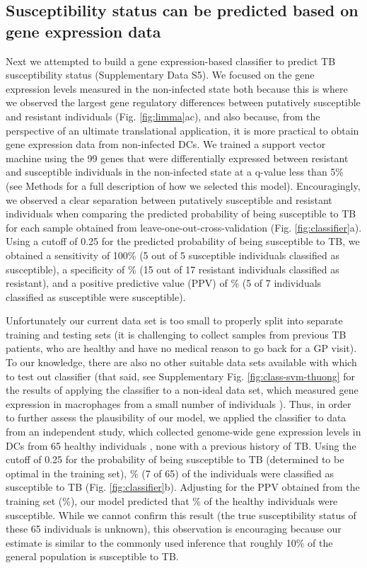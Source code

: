 \documentclass[fleqn,10pt]{wlscirep}
\begin{document}
\subsection*{Susceptibility status can be predicted based on gene expression data}

Next we attempted to build a gene expression-based classifier to
predict TB susceptibility status (Supplementary Data S5). We focused
on the gene expression levels measured in the non-infected state both
because this is where we observed the largest gene regulatory
differences between putatively susceptible and resistant individuals
(Fig. \ref{fig:limma}ac), and also because, from the perspective of an
ultimate translational application, it is more practical to obtain
gene expression data from non-infected DCs. We trained a support
vector machine using the 99 genes that were differentially expressed
between resistant and susceptible individuals in the non-infected
state at a q-value less than 5\% (see Methods for a full description
of how we selected this model). Encouragingly, we observed a clear
separation between putatively susceptible and resistant individuals
when comparing the predicted probability of being susceptible to TB
for each sample obtained from leave-one-out-cross-validation (Fig.
\ref{fig:classifier}a). Using a cutoff of 0.25 for the predicted
probability of being susceptible to TB, we obtained a sensitivity of
100\% (5 out of 5 susceptible individuals classified as susceptible),
a specificity of \% (15 out of 17 resistant individuals
classified as resistant), and a positive predictive value (PPV) of
\% (5 of 7 individuals classified as susceptible were
susceptible).

Unfortunately our current data set is too small to properly split into
separate training and testing sets (it is challenging to collect
samples from previous TB patients, who are healthy and have no medical
reason to go back for a GP visit). To our knowledge, there are also no
other suitable data sets available with which to test out classifier
(that said, see Supplementary Fig. \ref{fig:class-svm-thuong} for the
results of applying the classifier to a non-ideal data set, which
measured gene expression in macrophages from a small number of
individuals \cite{Thuong2008}). Thus, in order to further assess the
plausibility of our model, we applied the classifier to data from an
independent study, which collected genome-wide gene expression levels
in DCs from 65 healthy individuals \cite{Barreiro2012}, none with a
previous history of TB. Using the cutoff of 0.25 for the probability
of being susceptible to TB (determined to be optimal in the training
set), \% (7 of 65) of the individuals were classified
as susceptible to TB (Fig. \ref{fig:classifier}b). Adjusting for the
PPV obtained from the training set (\%), our model
predicted that \% of the healthy individuals were
susceptible. While we cannot confirm this result (the true
susceptibility status of these 65 individuals is unknown), this
observation is encouraging because our estimate is similar to the
commonly used inference that roughly 10\% of the general population is
susceptible to TB.
\end{document}
